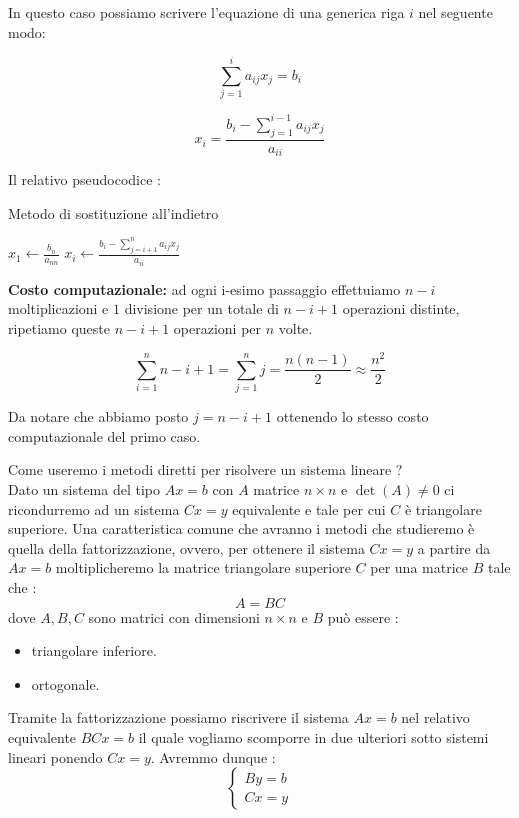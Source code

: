 \documentclass[12pt, a4paper]{book}
\theoremstyle{definition}
\begin{document}
\begin{flushleft}
\begin{enumerate}
In questo caso possiamo scrivere l'equazione di una generica riga $i$ nel seguente modo:

\[
		\sum_{j = 1} ^ {i} a_{ij}x_{j} = b_{i}
\]	

\[
		x_{i} = \frac{ b_{i} - \sum_{j = 1} ^ {i-1} a_{ij}x_{j}}{a_{ii}}
\]	


Il relativo pseudocodice : 

\begin{algorithm}
		\caption{ Metodo di sostituzione all'indietro}
		\begin{algorithmic} 
			\STATE $ x_{1} \leftarrow  \frac{b_{n}}{a_{nn}}$
				\STATE $ x_{i} \leftarrow  \frac{ b_{i} - \sum_{j = i+1} ^ {n} a_{ij}x_{j}}{a_{ii}} $
			\ENDFOR
		\end{algorithmic}
\end{algorithm}	
\vspace{1em}
\textbf{Costo computazionale:} ad ogni i-esimo passaggio effettuiamo $n-i$ moltiplicazioni e $1$ divisione per un totale di $n-i+1$ operazioni distinte,  ripetiamo queste $n-i+1$ operazioni per $n$ volte. 

\[
	\sum_{i = 1}^{n} n-i+1 = \sum_{j= 1}^{n} j =  \frac{n(n-1)}{2} \approx \frac{n^{2}}{2}
\]

Da notare che abbiamo posto $j = n-i+1$ ottenendo lo stesso costo computazionale del primo caso.
\end{enumerate}

Come useremo i metodi diretti per risolvere un sistema lineare ?\\
Dato un sistema del tipo $Ax = b$ con $A$ matrice $n \times n $ e $\det(A) \neq 0$ ci ricondurremo ad un sistema $Cx = y$ equivalente e tale per cui $C$ è triangolare superiore.
Una caratteristica comune che avranno i metodi che studieremo è quella della fattorizzazione, ovvero,  per ottenere il sistema  $Cx = y$ a partire da  $Ax = b$  moltiplicheremo la matrice triangolare superiore $C$ per una matrice $B$ tale che : 
\[ 
	A = BC
\]
dove $A,B,C$ sono matrici con dimensioni $n \times n$ e $B$ può essere :
\begin{itemize}
	\item triangolare inferiore.
	\item ortogonale.
\end{itemize}

Tramite la fattorizzazione possiamo riscrivere il sistema $Ax = b$ nel relativo equivalente $BCx = b$ il quale vogliamo scomporre in due ulteriori sotto sistemi lineari  ponendo $Cx = y$. Avremmo dunque :
\[ 
		\begin{cases}
				By = b\\
				Cx = y
		\end{cases}	
\]


\end{flushleft}
\end{document}
